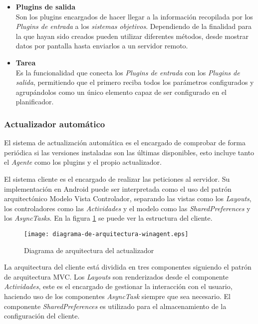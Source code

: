 \begin{enumerate}
\begin{itemize}
                        \item \textbf{Plugins de salida} \\
                        Son los plugins encargados de hacer llegar a la información recopilada por los \textit{Plugins de entrada} a los \textit{sistemas objetivos}. Dependiendo de la finalidad para la que hayan sido creados pueden utilizar diferentes métodos, desde mostrar datos por pantalla hasta enviarlos a un servidor remoto.
                        
                        \item \textbf{Tarea} \\
                        Es la funcionalidad que conecta los \textit{Plugins de entrada} con los \textit{Plugins de salida}, permitiendo que el primero reciba todos los parámetros configurados y agrupándolos como un único elemento capaz de ser configurado en el planificador.
                        
                    \end{itemize}
            \end{enumerate}

        \subsubsection{Actualizador automático}
            El sistema de actualización automática es el encargado de comprobar de forma periódica si las versiones instaladas son las últimas disponibles, esto incluye tanto el \textit{Agente} como los plugins y el propio actualizador.
        
            El sistema cliente es el encargado de realizar las peticiones al servidor. Su implementación en Android puede ser interpretada como el uso del patrón arquitectónico Modelo Vista Controlador, separando las vistas como los \textit{Layouts}, los controladores como las \textit{Actividades} y el modelo como las \textit{SharedPreferences} y los \textit{AsyncTasks}. En la figura \ref{fig:client_diagram} se puede ver la estructura del cliente.

            \begin{figure}[h!]
            \centering
                \texttt{[image: diagrama-de-arquitectura-winagent.eps]}
                \caption{Diagrama de arquitectura del actualizador}
                \label{fig:client_diagram}
            \end{figure}

            La arquitectura del cliente está dividida en tres componentes siguiendo el patrón de arquitectura MVC. Los \textit{Layouts} son renderizados desde el componente \textit{Actividades}, este es el encargado de gestionar la interacción con el usuario, haciendo uso de los componentes \textit{AsyncTask} siempre que sea necesario. El componente \textit{SharedPreferences} es utilizado para el almacenamiento de la configuración del cliente.


